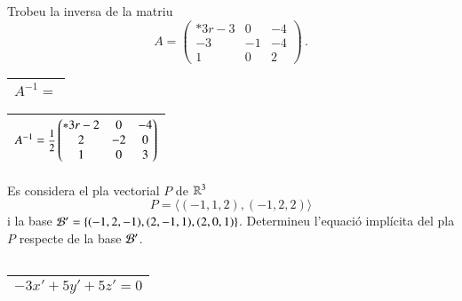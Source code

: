 \documentclass[11pt,catalan]{article}
\begin{document}
\begin{enunciat}
Trobeu la inversa de la matriu 
\[
  A = \begin{pmatrix}{*{3}r} -3 & 0 & -4\\ -3 & -1 & -4\\ 1 & 0 & 2\end{pmatrix}\,.
\]
\end{enunciat}

\begin{quadricula}
\begin{tabular}{|L{5cm}{1.25cm}|}
\hline
$A^{-1}=$ \\
\hline
\end{tabular}
\end{quadricula}

\begin{solucio}
\begin{center}
\begin{tabular}{|C{5cm}{1.25cm}|}
\hline
$A^{-1}=\deufrac{1}{2}\begin{pmatrix}{*{3}r} -2 & 0 & -4\\ 2 & -2 & 0\\ 1 & 0 & 3\end{pmatrix}$ \\
\hline
\end{tabular}
\end{center}
\end{solucio}


\begin{enunciat}
Es considera el pla vectorial $P$ de $\rn 3$
\[
  P = \langle (-1,1,2), (-1,2,2) \rangle
\]
i la base $\cal B'=\{(-1,2,-1),(2,-1,1),(2,0,1)\}$. Determineu l'equació implícita del pla $P$ respecte de la base $\cal B'$.
\end{enunciat}

\begin{quadricula}
\begin{tabular}{|C{5cm}{0.5cm}|}
\hline
 \\
\hline
\end{tabular}
\end{quadricula}

\begin{solucio}
\begin{center}
\begin{tabular}{|C{5cm}{0.5cm}|}
\hline
$- 3 x' + 5 y' + 5 z' = 0$ \\
\hline
\end{tabular}
\end{center}
\end{solucio}
\end{document}
